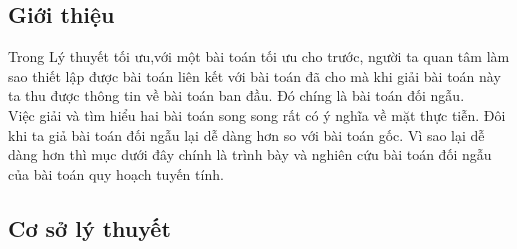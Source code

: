 \documentclass{article}
\begin{document}
    \subsection{Giới thiệu}
        Trong Lý thuyết tối ưu,với một bài toán tối ưu cho trước, người ta quan tâm làm sao thiết lập được bài toán liên kết với bài toán đã cho mà khi giải bài toán này ta thu được thông tin về bài toán ban đầu. Đó chíng là bài toán đối ngẫu. \\
        Việc giải và tìm hiểu hai bài toán song song rất có ý nghĩa về mặt thực tiễn. Đôi khi ta giả bài toán đối ngẫu lại dễ dàng hơn so với bài toán gốc. Vì sao lại dễ dàng hơn thì mục dưới đây chính là trình bày và nghiên cứu bài toán đối ngẫu của bài toán quy hoạch tuyến tính.
    \subsection{Cơ sở lý thuyết}
\end{document}
